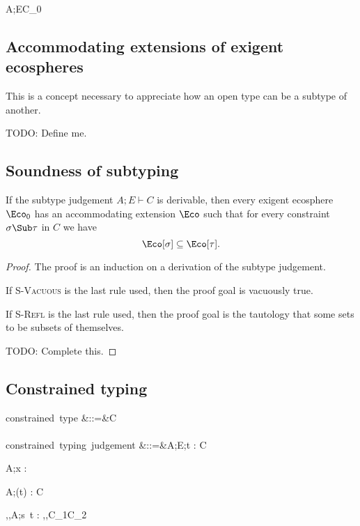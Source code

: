 \documentclass{amsart}
\theoremstyle{definition}
\begin{document}
{A;E\vdash C_0}

\subsection{Accommodating extensions of exigent ecospheres}
This is a concept necessary to appreciate how an open type can be
a subtype of another.

TODO: Define me.

\subsection{Soundness of subtyping}
\label{subsound}
If the subtype judgement $A;E\vdash C$ is derivable, then every
exigent ecosphere $\Eco_0$ has an accommodating extension $\Eco$
such that for every constraint $\sigma\Sub\tau$ in $C$ we have
\[
\Eco[\sigma] \subseteq \Eco[\tau].
\]

\begin{proof}
The proof is an induction on a derivation of the subtype
judgement.

If \textsc{S-Vacuous} is the last rule used, then the proof goal
is vacuously true.

If \textsc{S-Refl} is the last rule used, then the proof goal is
the tautology that some sets to be subsets of themselves.

TODO: Complete this.
\end{proof}

\subsection{Constrained typing}
\begin{syntax}
\mbox{constrained type}
&::=&\tau \Given C
\\\\
\mbox{constrained typing judgement}
&::=&A;E;\Gamma \vdash t : \tau \Given C
\end{syntax}%
{A;\Gamma\vdash x : \tau \Given \emptyset}

{A;\Gamma\vdash (t) : \sigma\R\tau \Given C}

{\alpha,\beta,A;\Gamma\vdash s~t : \beta \Given
\sigma\Sub\alpha\R\beta,\tau\Sub\alpha,C_1\cup C_2}
\end{document}
